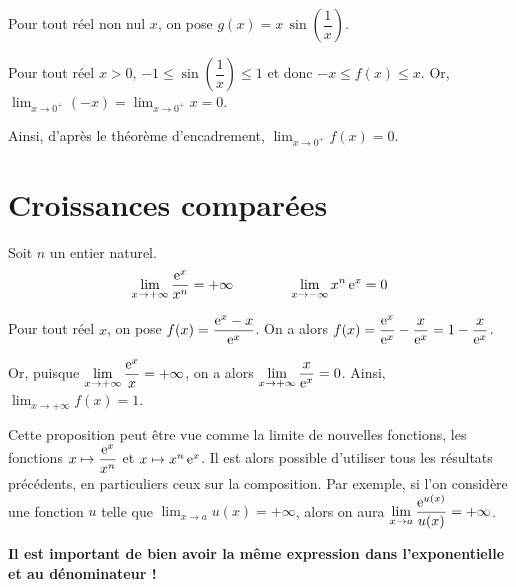 \documentclass[11pt,fleqn, openany]{book} %
\begin{document}
\begin{example}Pour tout réel non nul $x$, on pose $g(x)=x\,\sin\left(\dfrac{1}{x}\right)$.

Pour tout réel $x>0$, $-1\leqslant \sin\left(\dfrac{1}{x}\right)\leqslant 1$ et donc $-x \leqslant f(x) \leqslant x$. Or, $\displaystyle\lim_{x \to 0^+}(-x)=\displaystyle\lim_{x \to 0^+}x=0$. 

Ainsi, d'après le théorème d'encadrement, $\displaystyle\lim_{x \to 0^+}f(x)=0$.\end{example}


\section{Croissances comparées}

\begin{proposition} Soit $n$ un entier naturel.
\[\displaystyle \lim_{x \to +\infty} \dfrac{\mathrm{e}^x}{x^n}=+\infty \qquad \qquad \displaystyle \lim_{x \to -\infty} x^n\,\mathrm{e}^x =0\]\end{proposition}


\begin{example} Pour tout réel $x$, on pose $f(x)=\dfrac{\mathrm{e}^x-x}{\mathrm{e}^x}$. On a alors $f(x)=\dfrac{\mathrm{e}^x}{\mathrm{e}^x}-\dfrac{x}{\mathrm{e}^x}=1-\dfrac{x}{\mathrm{e}^x}$.

Or, puisque $\displaystyle \lim_{x \to +\infty} \dfrac{\mathrm{e}^x}{x}=+\infty$, on a alors $\displaystyle \lim_{x \to +\infty} \dfrac{x}{\mathrm{e}^x}=0$. Ainsi, $\displaystyle \lim_{x \to +\infty} f(x)=1$.\end{example}

Cette proposition peut être vue comme la limite de nouvelles fonctions, les fonctions $x\mapsto \dfrac{\mathrm{e}^x}{x^n}$ et $x\mapsto x^n\,\mathrm{e}^x$. Il est alors possible d'utiliser tous les résultats précédents, en particuliers ceux sur la composition. Par exemple, si l'on considère une fonction $u$ telle que $\displaystyle\lim_{x \to a}u(x)=+\infty$, alors on aura $\displaystyle\lim_{x \to a}\dfrac{\mathrm{e}^{u(x)}}{u(x)}=+\infty$.

\textbf{Il est important de bien avoir la même expression dans l'exponentielle et au dénominateur !}
\end{document}
